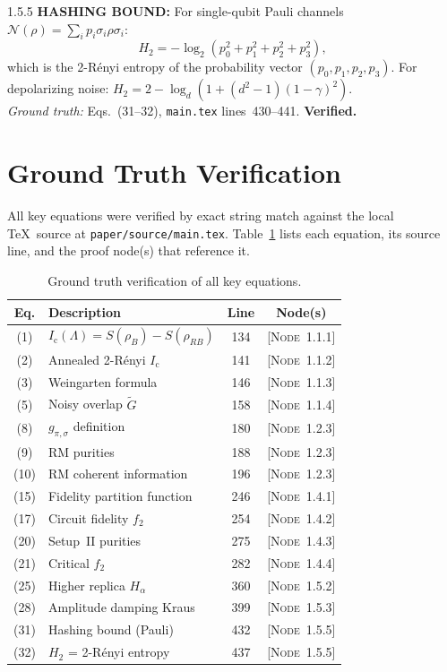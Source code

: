 \documentclass[11pt,a4paper]{article}
\newcommand{\Ic}{I_{\mathrm{c}}}
\newcommand{\Noise}{\mathcal{N}}
\newcommand{\noderef}[1]{\textsc{[Node~#1]}}
\begin{document}
\begin{proofnode}{1.5.5}
\textbf{HASHING BOUND:} For single-qubit Pauli channels $\Noise(\rho) = \sum_i p_i \sigma_i \rho \sigma_i$:
\begin{equation}
    H_2 = -\log_2(p_0^2 + p_1^2 + p_2^2 + p_3^2),
    \label{eq:H2_pauli}
\end{equation}
which is the 2-R\'enyi entropy of the probability vector $(p_0, p_1, p_2, p_3)$. For depolarizing noise: $H_2 = 2 - \log_d(1+(d^2-1)(1-\gamma)^2)$.\\
\textit{Ground truth:} Eqs.~(31--32), \texttt{main.tex} lines~430--441. \textbf{Verified.}
\end{proofnode}

\section{Ground Truth Verification}
\label{sec:ground_truth}

All key equations were verified by exact string match against the local \TeX\ source at \texttt{paper/source/main.tex}. Table~\ref{tab:ground_truth} lists each equation, its source line, and the proof node(s) that reference it.

\begin{table}[H]
\centering
\caption{Ground truth verification of all key equations.}
\label{tab:ground_truth}
\small
\begin{tabular}{clcc}
\toprule
\textbf{Eq.} & \textbf{Description} & \textbf{Line} & \textbf{Node(s)} \\
\midrule
(1) & $\Ic(\Lambda) = S(\rho_B) - S(\rho_{RB})$ & 134 & \noderef{1.1.1} \\
(2) & Annealed 2-R\'enyi $\Ic$ & 141 & \noderef{1.1.2} \\
(3) & Weingarten formula & 146 & \noderef{1.1.3} \\
(5) & Noisy overlap $\tilde{G}$ & 158 & \noderef{1.1.4} \\
(8) & $g_{\pi,\sigma}$ definition & 180 & \noderef{1.2.3} \\
(9) & RM purities & 188 & \noderef{1.2.3} \\
(10) & RM coherent information & 196 & \noderef{1.2.3} \\
(15) & Fidelity partition function & 246 & \noderef{1.4.1} \\
(17) & Circuit fidelity $f_2$ & 254 & \noderef{1.4.2} \\
(20) & Setup~II purities & 275 & \noderef{1.4.3} \\
(21) & Critical $f_2$ & 282 & \noderef{1.4.4} \\
(25) & Higher replica $H_\alpha$ & 360 & \noderef{1.5.2} \\
(28) & Amplitude damping Kraus & 399 & \noderef{1.5.3} \\
(31) & Hashing bound (Pauli) & 432 & \noderef{1.5.5} \\
(32) & $H_2$ = 2-R\'enyi entropy & 437 & \noderef{1.5.5} \\
\bottomrule
\end{tabular}
\end{table}
\end{document}
